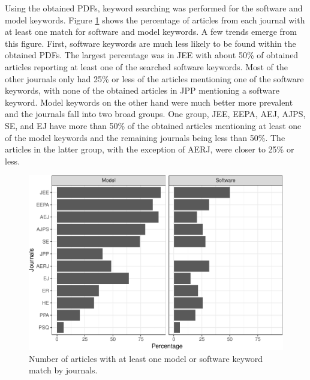 \documentclass[english,,man]{apa6}
\theoremstyle{definition}
\theoremstyle{definition}
\theoremstyle{definition}
\theoremstyle{remark}
\begin{document}
Using the obtained PDFs, keyword searching was performed for the
software and model keywords. Figure \ref{fig:count-software} shows the
percentage of articles from each journal with at least one match for
software and model keywords. A few trends emerge from this figure.
First, software keywords are much less likely to be found within the
obtained PDFs. The largest percentage was in JEE with about 50\% of
obtained articles reporting at least one of the searched software
keywords. Most of the other journals only had 25\% or less of the
articles mentioning one of the software keywords, with none of the
obtained articles in JPP mentioning a software keyword. Model keywords
on the other hand were much better more prevalent and the journals fall
into two broad groups. One group, JEE, EEPA, AEJ, AJPS, SE, and EJ have
more than 50\% of the obtained articles mentioning at least one of the
model keywords and the remaining journals being less than 50\%. The
articles in the latter group, with the exception of AERJ, were closer to
25\% or less.

\begin{figure}
\centering
\includegraphics{software_files/figure-latex/count-software-1.pdf}
\caption{\label{fig:count-software}Number of articles with at least one
model or software keyword match by journals.}
\end{figure}
\end{document}
